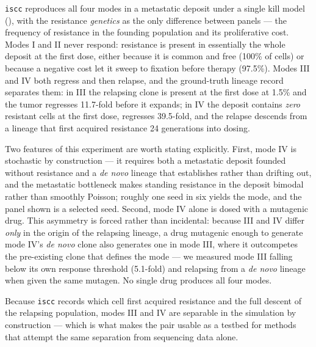 \documentclass{article}
\begin{document}
\texttt{iscc} reproduces all four modes in a metastatic deposit under a single kill model
(), with the resistance \emph{genetics} as the only difference between panels ---
the frequency of resistance in the founding population and its proliferative cost. Modes I and II
never respond: resistance is present in essentially the whole deposit at the first dose, either
because it is common and free (100\% of cells) or because a negative cost let it sweep to fixation
before therapy (97.5\%). Modes III and IV both regress and then relapse, and the ground-truth
lineage record separates them: in III the relapsing clone is present at the first dose at 1.5\% and
the tumor regresses 11.7-fold before it expands; in IV the deposit contains \emph{zero} resistant
cells at the first dose, regresses 39.5-fold, and the relapse descends from a lineage that first
acquired resistance 24 generations into dosing.

Two features of this experiment are worth stating explicitly. First, mode IV is stochastic by
construction --- it requires both a metastatic deposit founded without resistance and a \emph{de
novo} lineage that establishes rather than drifting out, and the metastatic bottleneck makes
standing resistance in the deposit bimodal rather than smoothly Poisson; roughly one seed in six
yields the mode, and the panel shown is a selected seed. Second, mode IV alone is dosed with a
mutagenic drug. This asymmetry is forced rather than incidental: because III and IV differ
\emph{only} in the origin of the relapsing lineage, a drug mutagenic enough to generate mode IV's
\emph{de novo} clone also generates one in mode III, where it outcompetes the pre-existing clone
that defines the mode --- we measured mode III falling below its own response threshold (5.1-fold)
and relapsing from a \emph{de novo} lineage when given the same mutagen. No single drug produces
all four modes.

Because \texttt{iscc} records which cell first acquired resistance and the full descent of the
relapsing population, modes III and IV are separable in the simulation by construction --- which is
what makes the pair usable as a testbed for methods that attempt the same separation from sequencing
data alone.
\end{document}
